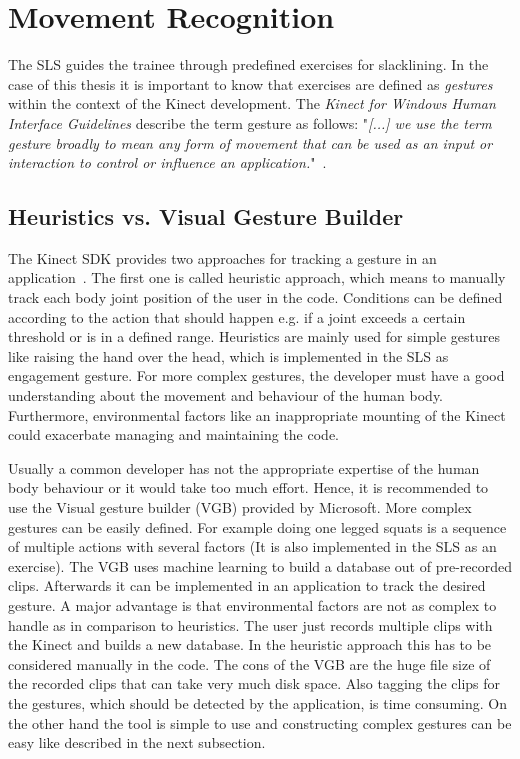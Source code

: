 \section{Movement Recognition}\label{5_3_movementRecognition}
The SLS guides the trainee through predefined exercises for slacklining. In the case of this thesis it is important to know that exercises are defined as \textit{gestures} within the context of the Kinect development. The \textit{Kinect for Windows Human Interface Guidelines} describe the term gesture as follows: "\textit{[...] we use the term gesture broadly to mean any form of movement that can be used as an input or interaction to control or influence an application.}"~\cite{MicrosoftHIG2014-mh}.

\subsection{Heuristics vs. Visual Gesture Builder}
The Kinect SDK provides two approaches for tracking a gesture in an application~\cite{MicrosoftVGB}.
The first one is called heuristic approach, which means to manually track each body joint position of the user in the code.
Conditions can be defined according to the action that should happen e.g. if a joint exceeds a certain threshold or is in a defined range.
Heuristics are mainly used for simple gestures like raising the hand over the head, which is implemented in the SLS as engagement gesture.
For more complex gestures, the developer must have a good understanding about the movement and behaviour of the human body.
Furthermore, environmental factors like an inappropriate mounting of the Kinect could exacerbate managing and maintaining the code.

Usually a common developer has not the appropriate expertise of the human body behaviour or it would take too much effort.
Hence, it is recommended to use the Visual gesture builder (VGB) provided by Microsoft. 
More complex gestures can be easily defined. For example doing one legged squats is a sequence of multiple actions with several factors (It is also implemented in the SLS as an exercise).
The VGB uses machine learning to build a database out of pre-recorded clips.
Afterwards it can be implemented in an application to track the desired gesture.
A major advantage is that environmental factors are not as complex to handle as in comparison to heuristics.
The user just records multiple clips with the Kinect and builds a new database.
In the heuristic approach this has to be considered manually in the code.
The cons of the VGB are the huge file size of the recorded clips that can take very much disk space.
Also tagging the clips for the gestures, which should be detected by the application, is time consuming. 
On the other hand the tool is simple to use and constructing complex gestures can be easy like described in the next subsection.


